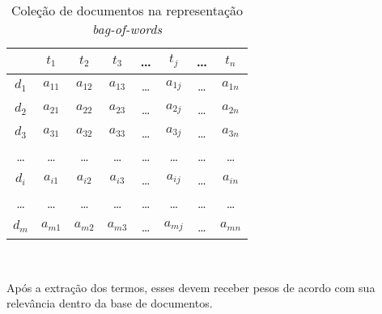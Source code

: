 \begin{table}[!h]
	\centering

	\begin{tabular}{|c|c|c|c|c|c|c|c|}

	\hline
	    & $t_1$      & $t_2$     & $t_3$    & \dots& $t_j$    & \dots & $t_n$      \\ \hline
	$d_1$ & $a_{11}$ & $a_{12}$  & $a_{13}$ & \dots& $a_{1j}$ & \dots & $a_{1n}$   \\ \hline 
	$d_2$ & $a_{21}$ & $a_{22}$  & $a_{23}$ & \dots& $a_{2j}$ & \dots & $a_{2n}$   \\ \hline 
	$d_3$ & $a_{31}$ & $a_{32}$  & $a_{33}$ & \dots& $a_{3j}$ & \dots & $a_{3n}$   \\ \hline 
	\dots & \dots    & \dots     & \dots    & \dots& \dots    & \dots & \dots      \\ \hline 
	$d_i$ & $a_{i1}$ & $a_{i2}$  & $a_{i3}$ & \dots& $a_{ij}$ & \dots & $a_{in}$   \\ \hline 
	\dots & \dots    & \dots     & \dots    & \dots& \dots    & \dots & \dots      \\ \hline 
	$d_m$ & $a_{m1}$ & $a_{m2}$  & $a_{m3}$ & \dots& $a_{mj}$ & \dots & $a_{mn}$   \\ \hline 

	\end{tabular}

	\caption{Coleção de documentos na representação \textit{bag-of-words}}
	\label{table:bagofwords}\\ 
\end{table}




Após a extração dos termos, esses devem receber pesos de acordo com sua relevância dentro da base de documentos.


























